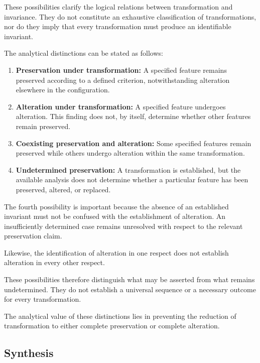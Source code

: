 These possibilities clarify the logical relations
between transformation and invariance. They do
not constitute an exhaustive classification of
transformations, nor do they imply that every
transformation must produce an identifiable invariant.

The analytical distinctions can be stated as follows:

\begin{enumerate}
    \item \textbf{Preservation under transformation:}
    A specified feature remains preserved according
    to a defined criterion, notwithstanding alteration
    elsewhere in the configuration.

    \item \textbf{Alteration under transformation:}
    A specified feature undergoes alteration. This
    finding does not, by itself, determine whether
    other features remain preserved.

    \item \textbf{Coexisting preservation and alteration:}
    Some specified features remain preserved while
    others undergo alteration within the same
    transformation.

    \item \textbf{Undetermined preservation:}
    A transformation is established, but the available
    analysis does not determine whether a particular
    feature has been preserved, altered, or replaced.
\end{enumerate}

The fourth possibility is important because the
absence of an established invariant must not be
confused with the establishment of alteration.
An insufficiently determined case remains
unresolved with respect to the relevant preservation
claim.

Likewise, the identification of alteration in one
respect does not establish alteration in every
other respect.

These possibilities therefore distinguish what
may be asserted from what remains undetermined.
They do not establish a universal sequence or
a necessary outcome for every transformation.

The analytical value of these distinctions lies
in preventing the reduction of transformation
to either complete preservation or complete
alteration.

\subsection{Synthesis}

